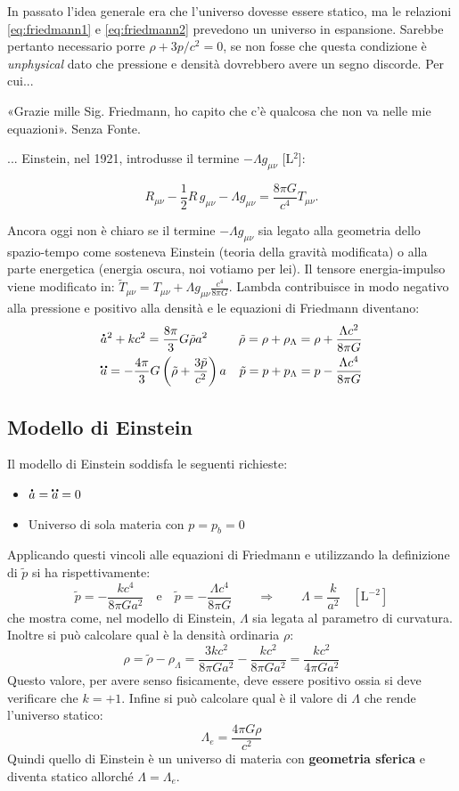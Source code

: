 In passato l'idea generale era che l'universo dovesse essere statico, ma le relazioni \ref{eq:friedmann1} e \ref{eq:friedmann2} prevedono un universo in espansione. Sarebbe pertanto necessario porre $\rho + 3p/c^2 = 0$, se non fosse che questa condizione è \textit{unphysical} dato che pressione e densità dovrebbero avere un segno discorde. Per cui...
\begin{definition}[Einstein:]
«Grazie mille Sig. Friedmann, ho capito che c'è qualcosa che non va nelle mie equazioni». Senza Fonte.
\end{definition}
... Einstein, nel 1921, introdusse il termine $- \Lambda g_{\mu \nu}$ [L$^2$]:

$$R_{\mu \nu} - \frac{1}{2} R \, g_{\mu \nu} - \Lambda g_{\mu \nu}= \frac{8 \pi G}{c^4} T_{\mu \nu}.$$

Ancora oggi non è chiaro se il termine $- \Lambda g_{\mu \nu}$ sia legato alla geometria dello spazio-tempo come sosteneva Einstein (teoria della gravità modificata) o alla parte energetica (energia oscura, noi votiamo per lei).  
Il tensore energia-impulso viene modificato in: $\tilde{T}_{\mu \nu}=T_{\mu \nu}+\Lambda g_{\mu \nu}\frac{c^4}{8 \pi G}$. Lambda contribuisce in modo negativo alla pressione e positivo alla densità e le equazioni di Friedmann diventano:
\begin{align}
    & \accentset{\mbox{\large\bfseries .}}{a}^2+kc^2  =\frac{8\pi}{3}G\tilde{\rho} a^2 & \tilde{\rho}=\rho + \rho_\Lambda = \rho + \frac{\Lambda c^2}{8 \pi G} \label{eq:friedmann2tilde} \\
   & \accentset{\mbox{\large\bfseries ..}}{a}  =-\frac{4\pi}{3}G\left ( \tilde{\rho}+\frac{3\tilde{p}}{c^2} \right )a & \tilde{p}=p + p_\Lambda = p - \frac{\Lambda c^4}{8 \pi G}  \label{eq:friedmann1tilde}
\end{align}


\subsection{Modello di Einstein}
Il modello di Einstein soddisfa le seguenti richieste: 
\begin{itemize}
    \item $\accentset{\mbox{\large\bfseries .}}{a}=\accentset{\mbox{\large\bfseries ..}}{a}=0$
    \item Universo di sola materia con $p=p_b=0$
\end{itemize}
Applicando questi vincoli alle equazioni di Friedmann e utilizzando la definizione di $\tilde{p}$ si ha rispettivamente:
$$
\tilde{p} = - \frac{k c^4}{8 \pi G a^2} \quad \mathrm{e}\quad \tilde{p}= -\frac{\Lambda c^4}{8 \pi G} \qquad  \Rightarrow \qquad \Lambda=\frac{k}{a^2}\quad \mathrm{[L^{-2}]}
$$
che mostra come, nel modello di Einstein, $\Lambda$ sia legata al parametro di curvatura. Inoltre si può calcolare qual è la densità ordinaria $\rho$:
$$
\rho = \tilde{\rho} - \rho_\Lambda = \frac{3 k c^2}{8 \pi G a^2} - \frac{k c^2}{8 \pi G a^2}=\frac{k c^2}{4 \pi G a^2}
$$
Questo valore, per avere senso fisicamente, deve essere positivo ossia si deve verificare che $k=+1$.
Infine si può calcolare qual è il valore di $\Lambda$ che rende l'universo statico:
$$
\Lambda_e = \frac{4\pi G\rho}{c^2}
$$
Quindi quello di Einstein è un universo di materia con \textbf{geometria sferica} e diventa statico allorché $\Lambda =\Lambda_e$. 


